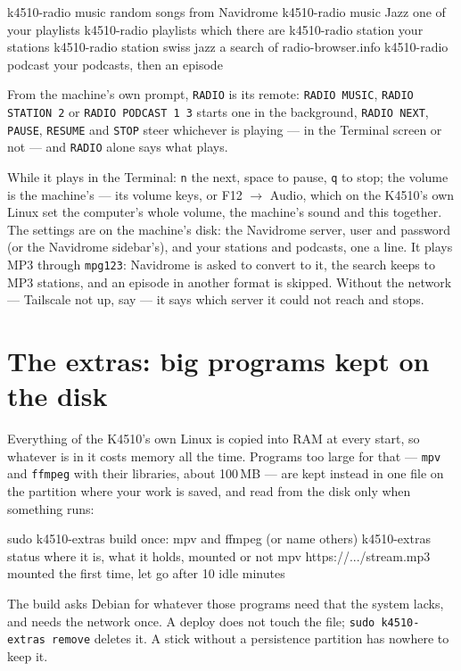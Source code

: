 \begin{type}
k4510-radio music                 random songs from Navidrome
k4510-radio music Jazz            one of your playlists
k4510-radio playlists             which there are
k4510-radio station               your stations
k4510-radio station swiss jazz    a search of radio-browser.info
k4510-radio podcast               your podcasts, then an episode
\end{type}

\noindent From the machine's own prompt, \verb|RADIO| is its remote:
\verb|RADIO MUSIC|, \verb|RADIO STATION 2| or \verb|RADIO PODCAST 1 3| starts
one in the background, \verb|RADIO NEXT|, \verb|PAUSE|, \verb|RESUME| and
\verb|STOP| steer whichever is playing --- in the Terminal screen or not ---
and \verb|RADIO| alone says what plays.

\noindent While it plays in the Terminal: \verb|n| the next, space to pause, \verb|q| to
stop; the volume is the machine's --- its volume keys, or F12
$\rightarrow$ Audio, which on the K4510's own Linux set the computer's
whole volume, the machine's sound and this together. The settings are
 on the machine's disk: the Navidrome server,
user and password (or the Navidrome sidebar's), and your stations and
podcasts, one a line. It plays MP3 through \verb|mpg123|: Navidrome is
asked to convert to it, the search keeps to MP3 stations, and an episode
in another format is skipped. Without the network --- Tailscale not up, say
--- it says which server it could not reach and stops.

\section{The extras: big programs kept on the disk}
Everything of the K4510's own Linux is copied into RAM at every start, so
whatever is in it costs memory all the time. Programs too large for that ---
\verb|mpv| and \verb|ffmpeg| with their libraries, about 100\,MB --- are kept
instead in one file on the partition where your work is saved, and read from
the disk only when something runs:

\begin{type}
sudo k4510-extras build           once: mpv and ffmpeg (or name others)
k4510-extras status               where it is, what it holds, mounted or not
mpv https://.../stream.mp3        mounted the first time, let go after 10 idle minutes
\end{type}

\noindent The build asks Debian for whatever those programs need that the
system lacks, and needs the network once. A deploy does not touch the file;
\verb|sudo k4510-extras remove| deletes it. A stick without a persistence
partition has nowhere to keep it.

